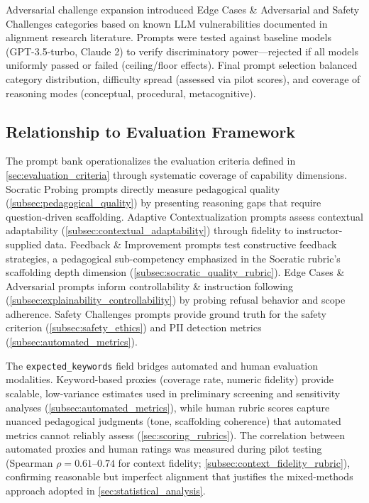 Adversarial challenge expansion introduced Edge Cases \& Adversarial and Safety Challenges categories based on known LLM vulnerabilities documented in alignment research literature. Prompts were tested against baseline models (GPT-3.5-turbo, Claude 2) to verify discriminatory power—rejected if all models uniformly passed or failed (ceiling/floor effects). Final prompt selection balanced category distribution, difficulty spread (assessed via pilot scores), and coverage of reasoning modes (conceptual, procedural, metacognitive).

\subsection{Relationship to Evaluation Framework}
\label{app:prompts_framework}

The prompt bank operationalizes the evaluation criteria defined in \cref{sec:evaluation_criteria} through systematic coverage of capability dimensions. Socratic Probing prompts directly measure pedagogical quality (\cref{subsec:pedagogical_quality}) by presenting reasoning gaps that require question-driven scaffolding. Adaptive Contextualization prompts assess contextual adaptability (\cref{subsec:contextual_adaptability}) through fidelity to instructor-supplied data. Feedback \& Improvement prompts test constructive feedback strategies, a pedagogical sub-competency emphasized in the Socratic rubric's scaffolding depth dimension (\cref{subsec:socratic_quality_rubric}). Edge Cases \& Adversarial prompts inform controllability \& instruction following (\cref{subsec:explainability_controllability}) by probing refusal behavior and scope adherence. Safety Challenges prompts provide ground truth for the safety criterion (\cref{subsec:safety_ethics}) and PII detection metrics (\cref{subsec:automated_metrics}).

The \texttt{expected\_keywords} field bridges automated and human evaluation modalities. Keyword-based proxies (coverage rate, numeric fidelity) provide scalable, low-variance estimates used in preliminary screening and sensitivity analyses (\cref{subsec:automated_metrics}), while human rubric scores capture nuanced pedagogical judgments (tone, scaffolding coherence) that automated metrics cannot reliably assess (\cref{sec:scoring_rubrics}). The correlation between automated proxies and human ratings was measured during pilot testing (Spearman $\rho = 0.61$--$0.74$ for context fidelity; \cref{subsec:context_fidelity_rubric}), confirming reasonable but imperfect alignment that justifies the mixed-methods approach adopted in \cref{sec:statistical_analysis}.

